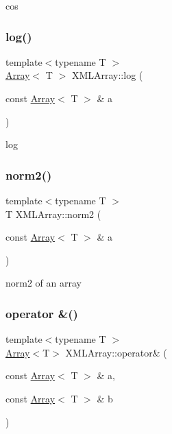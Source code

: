 cos 

\mbox{\label{namespaceXMLArray_adea4803e894b23debf6555f41722fc8a}} 
\subsubsection{\texorpdfstring{log()}{log()}}
{\footnotesize\ttfamily template$<$typename T $>$ \\
\mbox{\hyperlink{classXMLArray_1_1Array}{Array}}$<$ T $>$ X\+M\+L\+Array\+::log (\begin{DoxyParamCaption}\item[{const \mbox{\hyperlink{classXMLArray_1_1Array}{Array}}$<$ T $>$ \&}]{a }\end{DoxyParamCaption})\hspace{0.3cm}{\ttfamily [inline]}}



log 

\mbox{\label{namespaceXMLArray_a86ac84a2d19bf404766498fc122af036}} 
\subsubsection{\texorpdfstring{norm2()}{norm2()}}
{\footnotesize\ttfamily template$<$typename T $>$ \\
T X\+M\+L\+Array\+::norm2 (\begin{DoxyParamCaption}\item[{const \mbox{\hyperlink{classXMLArray_1_1Array}{Array}}$<$ T $>$ \&}]{a }\end{DoxyParamCaption})\hspace{0.3cm}{\ttfamily [inline]}}



norm2 of an array 

\mbox{\label{namespaceXMLArray_a4e97a656e19bfbb4c5574c3a60b2ed93}} 
\subsubsection{\texorpdfstring{operator \&()}{operator \&()}\hspace{0.1cm}{\footnotesize\ttfamily [1/3]}}
{\footnotesize\ttfamily template$<$typename T $>$ \\
\mbox{\hyperlink{classXMLArray_1_1Array}{Array}}$<$T$>$ X\+M\+L\+Array\+::operator\& (\begin{DoxyParamCaption}\item[{const \mbox{\hyperlink{classXMLArray_1_1Array}{Array}}$<$ T $>$ \&}]{a,  }\item[{const \mbox{\hyperlink{classXMLArray_1_1Array}{Array}}$<$ T $>$ \&}]{b }\end{DoxyParamCaption})\hspace{0.3cm}{\ttfamily [inline]}}




